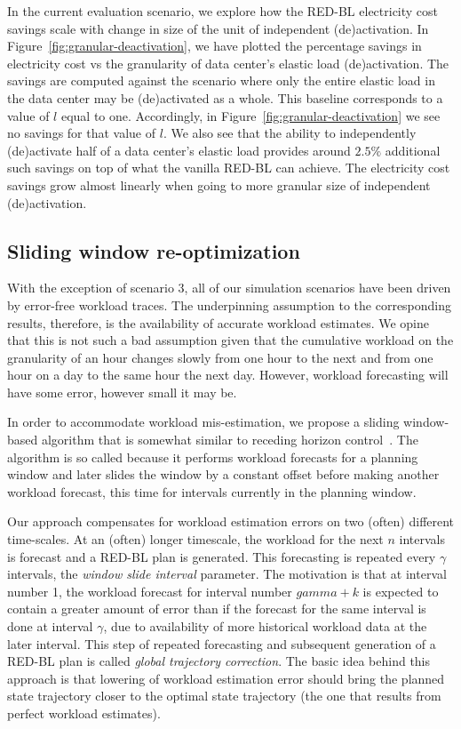 In the current evaluation scenario, we explore how the RED-BL electricity cost savings scale with change in size of the unit of independent (de)activation. In Figure~\ref{fig:granular-deactivation}, we have plotted the percentage savings in electricity cost vs the granularity of data center's elastic load (de)activation. The savings are computed against the scenario where only the entire elastic load in the data center may be (de)activated as a whole. This baseline corresponds to a value of $l$ equal to one. Accordingly, in Figure~\ref{fig:granular-deactivation} we see no savings for that value of $l$. We also see that the ability to independently (de)activate half of a data center's elastic load provides around $2.5\%$ additional such savings on top of what the vanilla RED-BL can achieve. The electricity cost savings grow almost linearly when going to more granular size of independent (de)activation.

\subsection{Sliding window re-optimization}
With the exception of scenario 3, all of our simulation scenarios have been driven by error-free workload traces. The underpinning assumption to the corresponding results, therefore, is the availability of accurate workload estimates. We opine that this is not such a bad assumption given that the cumulative workload on the granularity of an hour changes slowly from one hour to the next and from one hour on a day to the same hour the next day. However, workload forecasting will have some error, however small it may be. 

In order to accommodate workload mis-estimation, we propose a sliding window-based algorithm that is somewhat similar to receding horizon control~\cite{rhc}. The algorithm is so called because it performs workload forecasts for a planning window and later slides the window by a constant offset before making another workload forecast, this time for intervals currently in the planning window. 

Our approach compensates for workload estimation errors on two (often) different time-scales. At an (often) longer timescale, the workload for the next $n$ intervals is forecast and a RED-BL plan is generated. This forecasting is repeated every $\gamma$ intervals, the \textit{window slide interval} parameter. The motivation is that at interval number 1, the workload forecast for interval number $gamma+k$ is expected to contain a greater amount of error than if the forecast for the same interval is done at interval $\gamma$, due to availability of more historical workload data at the later interval. This step of repeated forecasting and subsequent generation of a RED-BL plan is called \textit{global trajectory correction}. The basic idea behind this approach is that lowering of workload estimation error should bring the planned state trajectory closer to the optimal state trajectory (the one that results from perfect workload estimates). 


